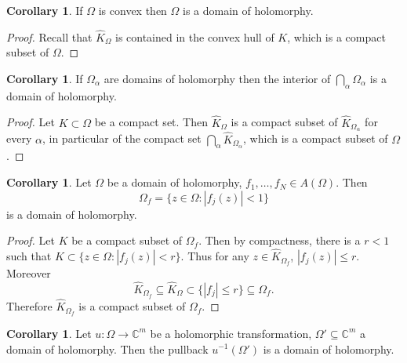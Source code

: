 \documentclass[12pt]{report}
\newcommand{\CC}{\mathbb{C}}
\theoremstyle{definition}
\newtheorem{corollary}[theorem]{Corollary}
\begin{document}
\begin{corollary}
    If $\Omega$ is convex then $\Omega$ is a domain of holomorphy.
\end{corollary}
\begin{proof}
    Recall that $\hat K_\Omega$ is contained in the convex hull of $K$, which is a compact subset of $\Omega$.
\end{proof}
\begin{corollary}
    If $\Omega_\alpha$ are domains of holomorphy then the interior of $\bigcap_\alpha \Omega_\alpha$ is a domain of holomorphy.
\end{corollary}
\begin{proof}
    Let $K \subset \Omega$ be a compact set. Then $\hat K_\Omega$ is a compact subset of $\hat K_{\Omega_\alpha}$ for every $\alpha$, in particular of the compact set $\bigcap_\alpha \hat K_{\Omega_\alpha}$, which is a compact subset of $\Omega$.
\end{proof}
\begin{corollary}
    Let $\Omega$ be a domain of holomorphy, $f_1, \dots, f_N \in A(\Omega)$. Then
    $$\Omega_f = \{z \in \Omega: |f_j(z)| < 1\}$$
    is a domain of holomorphy.
\end{corollary}
\begin{proof}
    Let $K$ be a compact subset of $\Omega_f$. Then by compactness, there is a $r < 1$ such that $K \subset \{z \in \Omega: |f_j(z)| < r\}$. Thus for any $z \in \hat K_{\Omega_f}$, $|f_j(z)| \leq r$. Moreover
    $$\hat K_{\Omega_f} \subseteq \hat K_\Omega \subset \{|f_j| \leq r\} \subseteq \Omega_f.$$
    Therefore $\hat K_{\Omega_f}$ is a compact subset of $\Omega_f$.
\end{proof}
\begin{corollary}
    Let $u: \Omega \to \CC^m$ be a holomorphic transformation, $\Omega' \subseteq \CC^m$ a domain of holomorphy. Then the pullback $u^{-1}(\Omega')$ is a domain of holomorphy.
\end{corollary}
\end{document}
